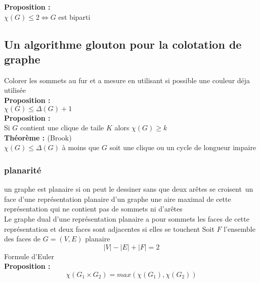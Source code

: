 \documentclass{report}
\newcommand{\propo}{\textcolor[rgb]{0,0,0.75}{Proposition : }}
\newcommand{\Propo}{\textbf{\propo}}
\newcommand{\thm}{\textcolor[rgb]{0,0.4,1}{Théorème : }}
\newcommand{\THM}{\textbf{\thm}}
\begin{document}
\Propo\\
$\chi(G) \leq 2 \Leftrightarrow G$ est biparti\\

\subsection{Un algorithme glouton pour la colotation de graphe}
Colorer les sommets au fur et a mesure en utilisant si possible une couleur déja utilisée\\

\Propo\\
$\chi(G) \leq \Delta(G)+1$\\

\Propo\\
Si $G$ contient une clique de taile $K$ alors $\chi(G) \geq k $\\

\THM (Brook)\\
$\chi(G) \leq \Delta(G)$ à moins que $G$ soit une clique ou un cycle de longueur impaire\\

\subsubsection{planarité}
un graphe est planaire si on peut le dessiner sans que deux arêtes se croisent\
un face d'une représentation planaire d'un graphe une aire maximal de cette représentation qui ne contient pas de sommets ni d'arêtes\\
Le graphe dual d'une représentation planaire a pour sommets les faces de cette représentation et deux faces sont adjacentes si elles se touchent
Soit $F$ l'ensemble des faces de $G=(V,E)$ planaire\\

$$\left|V\right|-\left|E\right|+\left|F\right|=2$$
Formule d'Euler\\

\Propo\\
$$\chi \left(G_1\times G_2\right)=max\left(\chi\left(G_1\right),\chi\left(G_2\right)\right)$$
\end{document}
